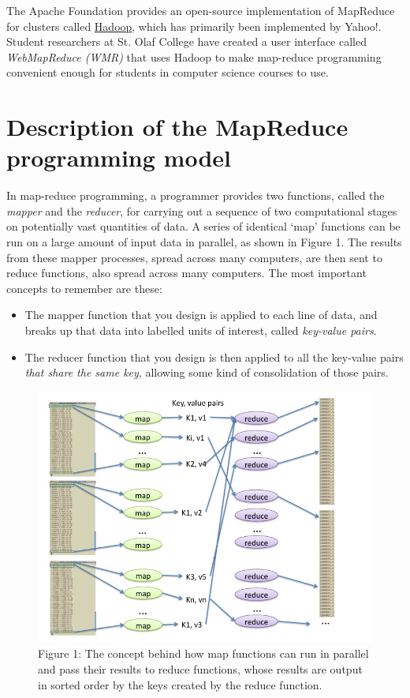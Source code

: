 \documentclass[letterpaper,10pt,openany,oneside]{sphinxmanual}
\begin{document}
The Apache Foundation provides an open-source implementation of
MapReduce for clusters called
\href{http://hadoop.apache.org/core/}{Hadoop}, which has primarily
been implemented by Yahoo!. Student researchers at St. Olaf College
have created a user interface called \emph{WebMapReduce (WMR)} that uses
Hadoop to make map-reduce programming convenient enough for
students in computer science courses to use.


\section{Description of the MapReduce programming model}
\label{MapReduceIntro/MapReduceIntro:description-of-the-mapreduce-programming-model}
In map-reduce programming, a programmer provides two functions,
called the \emph{mapper} and the \emph{reducer}, for carrying out a sequence
of two computational stages on potentially vast quantities of data.
A series of identical `map' functions can be run on a large amount
of input data in parallel, as shown in Figure 1. The
results from these mapper processes, spread across many computers,
are then sent to reduce functions, also spread across many
computers. The most important concepts to remember are these:
\begin{itemize}
\item {} 
The mapper function that you design is applied to each line of
data, and breaks up that data into labelled units of interest,
called \emph{key-value pairs}.

\item {} 
The reducer function that you design is then applied to all the
key-value pairs \emph{that share the same key}, allowing some kind of
consolidation of those pairs.

\end{itemize}
\begin{figure}[htbp]
\centering
\capstart

\includegraphics{Figure1.jpg}
\caption{Figure 1: The concept behind how map functions can run in parallel and
pass their results to reduce functions, whose results are output in
sorted order by the keys created by the reduce function.}\end{figure}
\end{document}
